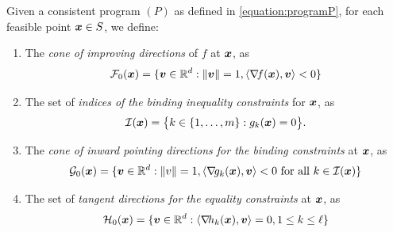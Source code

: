 \begin{definition}
Given a consistent program $(P)$ as defined in \eqref{equation:programP}, for each feasible point $\boldsymbol{x} \in S$, we define:
\begin{enumerate}
	\item The \emph{cone of improving directions} of $f$ at $\boldsymbol{x}$, as
	\begin{equation*}
	\mathcal{F}_0(\boldsymbol{x}) = \{ \boldsymbol{v} \in \mathbb{R}^d : \lVert \boldsymbol{v} \rVert=1, \langle \mathop{\nabla\! {f}}(\boldsymbol{x}), \boldsymbol{v} \rangle < 0 \}
	\end{equation*}
	\item The set of \emph{indices of the binding inequality constraints} for $\boldsymbol{x}$, as
	\begin{equation*}
	\mathcal{I}(\boldsymbol{x}) = \big\{ k \in \{1, \dotsc, m\} : g_k(\boldsymbol{x}) = 0 \big\}.
	\end{equation*}
	\item The \emph{cone of inward pointing directions for the binding constraints} at $\boldsymbol{x}$, as
	\begin{equation*}
	\mathcal{G}_0(\boldsymbol{x}) = \{ \boldsymbol{v} \in \mathbb{R}^d : \lVert v \rVert=1, \langle \mathop{\nabla\! {g_k}}(\boldsymbol{x}), \boldsymbol{v} \rangle < 0 \text{ for all } k \in \mathcal{I}(\boldsymbol{x}) \}
	\end{equation*}
	\item The set of \emph{tangent directions for the equality constraints} at $\boldsymbol{x}$, as
	\begin{equation*}
	\mathcal{H}_0(\boldsymbol{x}) = \{ \boldsymbol{v} \in \mathbb{R}^d : \langle \mathop{\nabla\! {h_k}}(\boldsymbol{x}), \boldsymbol{v} \rangle = 0, 1 \leq k \leq \ell \}
	\end{equation*}
\end{enumerate}
\end{definition}

